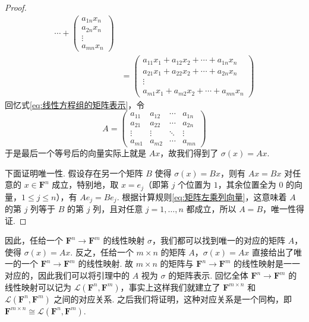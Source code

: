 \begin{proof}
\begin{align*}
        \cdots +
        \begin{pmatrix} a_{1n} x_n \\ a_{2n} x_n \\ \vdots \\ a_{mn} x_n \end{pmatrix} \\
        &= \begin{pmatrix}
            a_{11} x_1 + a_{12} x_2 + \cdots + a_{1n} x_n \\
            a_{21} x_1 + a_{22} x_2 + \cdots + a_{2n} x_n \\
            \vdots\\
            a_{m1} x_1 + a_{m2} x_2 + \cdots + a_{mn} x_n
        \end{pmatrix}
    \end{align*}
    回忆式\eqref{eq:线性方程组的矩阵表示}，令
    \[
        A = \begin{pmatrix}
            a_{11} & a_{12} & \cdots & a_{1n} \\
            a_{21} & a_{22} & \cdots & a_{2n} \\
            \vdots & \vdots & \ddots & \vdots \\
            a_{m1} & a_{m2} & \cdots & a_{mn}
        \end{pmatrix}
    \]
    于是最后一个等号后的向量实际上就是 $Ax$，故我们得到了 $\sigma(x) = Ax$.

    下面证明唯一性. 假设存在另一个矩阵 $B$ 使得 $\sigma(x) = Bx$，则有 $Ax = Bx$ 对任意的 $x \in \mathbf{F}^n$ 成立，特别地，取 $x = e_j$（即第 $j$ 个位置为 $1$，其余位置全为 $0$ 的向量，$1\leqslant j\leqslant n$），有 $Ae_j = Be_j$. 根据计算规则\autoref{eq:矩阵左乘列向量}，这意味着 $A$ 的第 $j$ 列等于 $B$ 的第 $j$ 列，且对任意 $j = 1,\ldots,n$ 都成立，所以 $A = B$，唯一性得证.
\end{proof}

因此，任给一个 $\mathbf{F}^n \to \mathbf{F}^m$ 的线性映射 $\sigma$，我们都可以找到唯一的对应的矩阵 $A$，使得 $\sigma(x) = Ax$. 反之，任给一个 $m \times n$ 的矩阵 $A$，$\sigma(x) = Ax$ 直接给出了唯一的一个 $\mathbf{F}^n \to \mathbf{F}^m$ 的线性映射. 故 $m \times n$ 的矩阵与 $\mathbf{F}^n \to \mathbf{F}^m$ 的线性映射是一一对应的，因此我们可以将引理中的 $A$ 视为 $\sigma$ 的矩阵表示. 回忆全体 $\mathbf{F}^n \to \mathbf{F}^m$ 的线性映射可以记为 $\mathcal{L}(\mathbf{F}^n, \mathbf{F}^m)$，事实上这样我们就建立了 $\mathbf{F}^{m\times n}$ 和 $\mathcal{L}(\mathbf{F}^n, \mathbf{F}^m)$ 之间的对应关系. 之后我们将证明，这种对应关系是一个同构，即 $\mathbf{F}^{m \times n} \cong \mathcal{L}(\mathbf{F}^n, \mathbf{F}^m)$.

